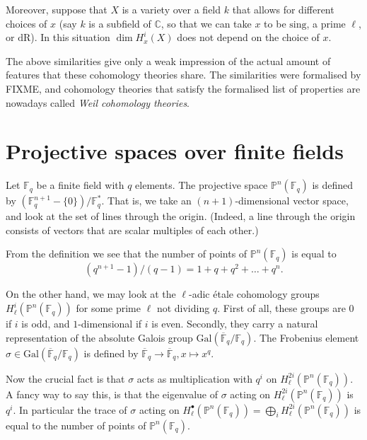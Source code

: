 \documentclass[a4paper,10pt]{article}
\begin{document}
Moreover, suppose that $X$ is a variety over a field $k$ that allows for
different choices of $x$ (say $k$ is a subfield of $\mathbb{C}$, so that we can
take $x$ to be $\mathrm{sing}$, a prime $\ell$, or $\mathrm{dR}$). In this
situation $\dim H_{x}^{i}(X)$ does not depend on the choice of $x$.

The above similarities give only a weak impression of the actual amount of
features that these cohomology theories share. The similarities were formalised
by FIXME, and cohomology theories that satisfy the formalised list of
properties are nowadays called \emph{Weil cohomology theories}.

\section{Projective spaces over finite fields}

Let $\mathbb{F}_{q}$ be a finite field with $q$ elements. The projective space
$\mathbb{P}^{n}(\mathbb{F}_{q})$ is defined by $(\mathbb{F}_{q}^{n+1} -
\{0\})/\mathbb{F}_{q}^{*}$. That is, we take an $(n+1)$-dimensional vector
space, and look at the set of lines through the origin. (Indeed, a line
through the origin consists of vectors that are scalar multiples of each
other.)

From the definition we see that the number of points of
$\mathbb{P}^{n}(\mathbb{F}_{q})$ is equal to
\[
	(q^{n+1} - 1)/(q-1) = 1 + q + q^{2} + \ldots + q^{n}.
\]

On the other hand, we may look at the $\ell$-adic \'{e}tale cohomology groups
$H_{\ell}^{i}(\mathbb{P}^{n}(\mathbb{F}_{q}))$ for some prime $\ell$ not
dividing $q$. First of all, these groups are $0$ if $i$ is odd, and
$1$-dimensional if $i$ is even. Secondly, they carry a natural representation
of the absolute Galois group
$\mathrm{Gal}(\overline{\mathbb{F}}_{q}/\mathbb{F}_{q})$. The Frobenius element
$\sigma \in \mathrm{Gal}(\overline{\mathbb{F}}_{q}/\mathbb{F}_{q})$ is defined
by $\overline{\mathbb{F}}_{q} \to \overline{\mathbb{F}}_{q}, x \mapsto x^{q}$.

Now the crucial fact is that $\sigma$ acts as multiplication with $q^{i}$ on
$H_{\ell}^{2i}(\mathbb{P}^{n}(\mathbb{F}_{q}))$. A fancy way to say this, is
that the eigenvalue of $\sigma$ acting on
$H_{\ell}^{2i}(\mathbb{P}^{n}(\mathbb{F}_{q}))$ is $q^{i}$. In particular the
trace of $\sigma$ acting on
$H_{\ell}^{\bullet}(\mathbb{P}^{n}(\mathbb{F}_{q})) = \bigoplus_{i}
H_{\ell}^{2i}(\mathbb{P}^{n}(\mathbb{F}_{q}))$ is equal to the number of points
of $\mathbb{P}^{n}(\mathbb{F}_{q})$.
\end{document}
